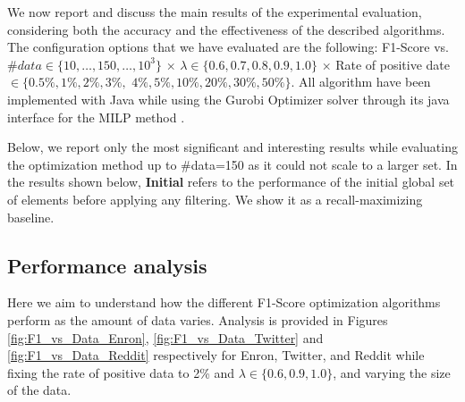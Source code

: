 
We now report and discuss the main results of the experimental evaluation, considering both the accuracy and the effectiveness of the described algorithms. The configuration options that we have evaluated are the following: F1-Score vs. $\#data \in \{10,\dots, 150,\dots, 10^3\}$ $\times$ $ \lambda \in \{  0.6,0.7,0.8,0.9,1.0 \}$ $\times$ Rate of positive date $\in \{0.5\%, 1\%, 2\%, 3\%,$ $ 4\%, 5\%, 10\%, 20\%, 30\%, 50\%\}$. All algorithm have been implemented with Java while using the Gurobi Optimizer solver through its java interface for the MILP method \cite{gurobi2017gurobi}.

Below, we report only the most significant and interesting results while evaluating the optimization method up to \#data=150 as it could not scale to a larger set. In the results shown below, {\bf Initial} refers to the performance of the initial global set of elements before applying any filtering.  We show it as a recall-maximizing baseline.




\subsection{Performance analysis}



 Here we aim to understand how the different F1-Score optimization algorithms perform as the amount of data varies.  Analysis is provided in Figures \ref{fig:F1_vs_Data_Enron}, \ref{fig:F1_vs_Data_Twitter} and \ref{fig:F1_vs_Data_Reddit} respectively for Enron, Twitter, and Reddit while fixing the rate of positive data to 2\% and $\lambda \in \{0.6,0.9,1.0\}$, and  varying the size of the data.



